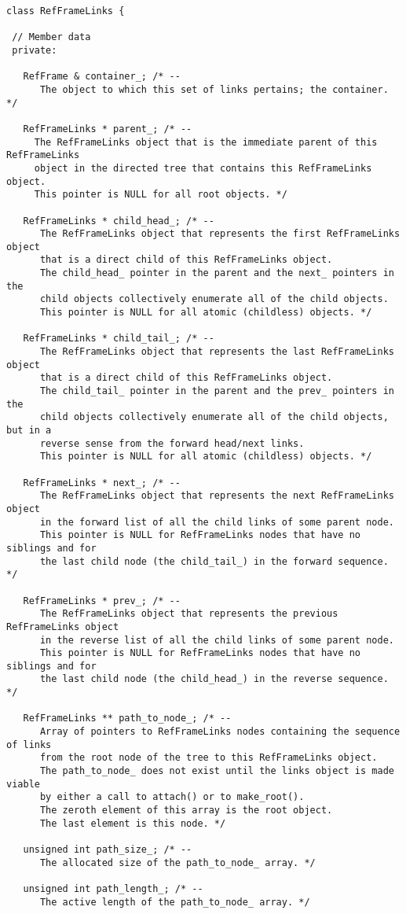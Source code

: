 \begin{verbatim}
class RefFrameLinks {

 // Member data
 private:

   RefFrame & container_; /* --
      The object to which this set of links pertains; the container. */

   RefFrameLinks * parent_; /* --
     The RefFrameLinks object that is the immediate parent of this RefFrameLinks
     object in the directed tree that contains this RefFrameLinks object.
     This pointer is NULL for all root objects. */

   RefFrameLinks * child_head_; /* --
      The RefFrameLinks object that represents the first RefFrameLinks object
      that is a direct child of this RefFrameLinks object.
      The child_head_ pointer in the parent and the next_ pointers in the
      child objects collectively enumerate all of the child objects.
      This pointer is NULL for all atomic (childless) objects. */

   RefFrameLinks * child_tail_; /* --
      The RefFrameLinks object that represents the last RefFrameLinks object
      that is a direct child of this RefFrameLinks object.
      The child_tail_ pointer in the parent and the prev_ pointers in the
      child objects collectively enumerate all of the child objects, but in a
      reverse sense from the forward head/next links.
      This pointer is NULL for all atomic (childless) objects. */

   RefFrameLinks * next_; /* --
      The RefFrameLinks object that represents the next RefFrameLinks object
      in the forward list of all the child links of some parent node.
      This pointer is NULL for RefFrameLinks nodes that have no siblings and for
      the last child node (the child_tail_) in the forward sequence. */

   RefFrameLinks * prev_; /* --
      The RefFrameLinks object that represents the previous RefFrameLinks object
      in the reverse list of all the child links of some parent node.
      This pointer is NULL for RefFrameLinks nodes that have no siblings and for
      the last child node (the child_head_) in the reverse sequence. */

   RefFrameLinks ** path_to_node_; /* --
      Array of pointers to RefFrameLinks nodes containing the sequence of links
      from the root node of the tree to this RefFrameLinks object.
      The path_to_node_ does not exist until the links object is made viable
      by either a call to attach() or to make_root().
      The zeroth element of this array is the root object.
      The last element is this node. */

   unsigned int path_size_; /* --
      The allocated size of the path_to_node_ array. */

   unsigned int path_length_; /* --
      The active length of the path_to_node_ array. */

\end{verbatim}

